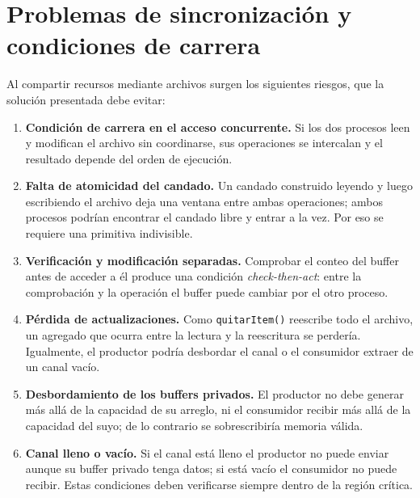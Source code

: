 \documentclass[12pt,letterpaper]{article}
\begin{document}
\section{Problemas de sincronizaci\'on y condiciones de carrera}
Al compartir recursos mediante archivos surgen los siguientes riesgos, que la
soluci\'on presentada debe evitar:
\begin{enumerate}[leftmargin=1.4cm]
    \item \textbf{Condici\'on de carrera en el acceso concurrente.} Si los dos
    procesos leen y modifican el archivo sin coordinarse, sus operaciones se
    intercalan y el resultado depende del orden de ejecuci\'on.

    \item \textbf{Falta de atomicidad del candado.} Un candado construido
    leyendo y luego escribiendo el archivo deja una ventana entre ambas
    operaciones; ambos procesos podr\'ian encontrar el candado libre y entrar a
    la vez. Por eso se requiere una primitiva indivisible.

    \item \textbf{Verificaci\'on y modificaci\'on separadas.} Comprobar el
    conteo del buffer antes de acceder a \'el produce una condici\'on
    \emph{check-then-act}: entre la comprobaci\'on y la operaci\'on el buffer
    puede cambiar por el otro proceso.

    \item \textbf{P\'erdida de actualizaciones.} Como \texttt{quitarItem()}
    reescribe todo el archivo, un agregado que ocurra entre la lectura y la
    reescritura se perder\'ia. Igualmente, el productor podr\'ia desbordar el
    canal o el consumidor extraer de un canal vac\'io.

    \item \textbf{Desbordamiento de los buffers privados.} El productor no debe
    generar m\'as all\'a de la capacidad de su arreglo, ni el consumidor
    recibir m\'as all\'a de la capacidad del suyo; de lo contrario se
    sobrescribir\'ia memoria v\'alida.

    \item \textbf{Canal lleno o vac\'io.} Si el canal est\'a lleno el productor
    no puede enviar aunque su buffer privado tenga datos; si est\'a vac\'io el
    consumidor no puede recibir. Estas condiciones deben verificarse siempre
    dentro de la regi\'on cr\'itica.
\end{enumerate}

\end{document}

